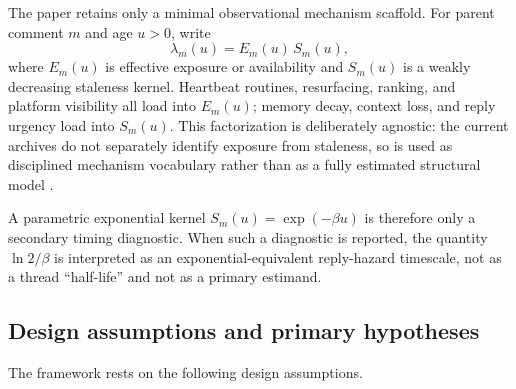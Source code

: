 The paper retains only a minimal observational mechanism scaffold. For parent
comment \(m\) and age \(u>0\), write
\begin{equation}
\label{eq:minimal-mechanism}
\lambda_m(u)=E_m(u)\,S_m(u),
\end{equation}
where \(E_m(u)\) is effective exposure or availability and \(S_m(u)\) is a
weakly decreasing staleness kernel. Heartbeat routines, resurfacing, ranking,
and platform visibility all load into \(E_m(u)\); memory decay, context loss,
and reply urgency load into \(S_m(u)\). This factorization is deliberately
agnostic: the current archives do not separately identify exposure from
staleness, so  is used as disciplined mechanism
vocabulary rather than as a fully estimated structural model
\citep{hawkes1971spectra,crane2008robust,cox1972regression}.

A parametric exponential kernel \(S_m(u)=\exp(-\beta u)\) is therefore only a
secondary timing diagnostic. When such a diagnostic is reported, the quantity
\(\ln 2/\beta\) is interpreted as an exponential-equivalent reply-hazard
timescale, not as a thread ``half-life'' and not as a primary estimand.

\subsection{Design assumptions and primary hypotheses}
\label{sec:model:assumptions}

The framework rests on the following design assumptions.

